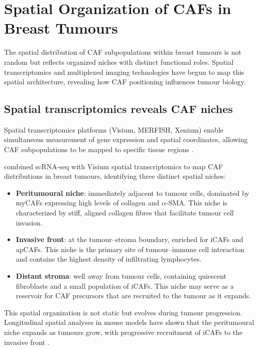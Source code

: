 \section{Spatial Organization of CAFs in Breast Tumours}
\label{sec:spatial}

The spatial distribution of CAF subpopulations within breast tumours is not random but reflects organized niches with distinct functional roles. Spatial transcriptomics and multiplexed imaging technologies have begun to map this spatial architecture, revealing how CAF positioning influences tumour biology.

\subsection{Spatial transcriptomics reveals CAF niches}

Spatial transcriptomics platforms (Visium, MERFISH, Xenium) enable simultaneous measurement of gene expression and spatial coordinates, allowing CAF subpopulations to be mapped to specific tissue regions \citep{stahl2016visualization}.

\citet{wu2020single} combined scRNA-seq with Visium spatial transcriptomics to map CAF distributions in breast tumours, identifying three distinct spatial niches:

\begin{itemize}
  \item \textbf{Peritumoural niche}: immediately adjacent to tumour cells, dominated by myCAFs expressing high levels of collagen and $\alpha$-SMA. This niche is characterized by stiff, aligned collagen fibres that facilitate tumour cell invasion.
  \item \textbf{Invasive front}: at the tumour--stroma boundary, enriched for iCAFs and apCAFs. This niche is the primary site of tumour--immune cell interaction and contains the highest density of infiltrating lymphocytes.
  \item \textbf{Distant stroma}: well away from tumour cells, containing quiescent fibroblasts and a small population of iCAFs. This niche may serve as a reservoir for CAF precursors that are recruited to the tumour as it expands.
\end{itemize}

This spatial organization is not static but evolves during tumour progression. Longitudinal spatial analyses in mouse models have shown that the peritumoural niche expands as tumours grow, with progressive recruitment of iCAFs to the invasive front \citep{erve2024}.

